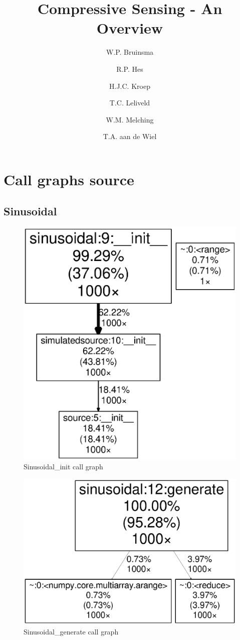 \documentclass[a4paper, openany, oneside]{memoir}
\title{Compressive Sensing - An Overview}
\author{W.P. Bruinsma \and R.P. Hes \and H.J.C. Kroep \and T.C. Leliveld \and W.M. Melching \and T.A. aan de Wiel}
\begin{document}
\section{Call graphs source}
\label{sec:call_graphs_source}
\subsection{Sinusoidal}
\label{sub:sinusoidal}
\begin{figure}[H]
    \centering
    \includegraphics[width=0.8\linewidth]{Sinusoidal_init}
    \caption{Sinusoidal\_init call graph}
    \label{fig:Sinusoidal_init}
\end{figure}

\begin{figure}[H]
    \centering
    \includegraphics[width=0.8\linewidth]{Sinusoidal_generate}
    \caption{Sinusoidal\_generate call graph}
    \label{fig:Sinusoidal_generate}
\end{figure}
\end{document}
